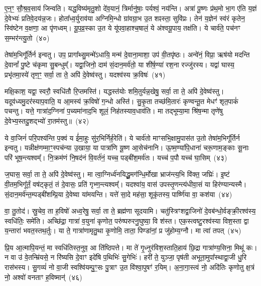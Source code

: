 ए॒न॒ꣳ॒ सौ॒श्र॒व॒साय॑ जिन्वति। यद्ध॒विष्य॑मृतु॒शो दे॑व॒यानं॒ त्रिर्मानु॑षाः॒ पर्यश्वं॒ नय॑न्ति। अत्रा॑ पू॒ष्णः प्र॑थ॒मो भा॒ग ए॑ति य॒ज्ञं दे॒वेभ्यः॑ प्रतिवे॒दय॑न्न॒जः। होता᳚ध्व॒र्युराव॑या अग्निमि॒न्धो ग्रा॑वग्रा॒भ उ॒त शꣴस्ता॒ सुवि॑प्रः। तेन॑ य॒ज्ञेन॑ स्व॑रं कृतेन॒ स्वि॑ष्टेन व॒क्षणा॒ आ पृ॑णध्वम्। यू॒प॒व्र॒स्का उ॒त ये यू॑पवा॒हाश्च॒षालं॒ ये अ॑श्वयू॒पाय॒ तक्ष॑ति। ये चार्व॑ते॒ पच॑नꣳ स॒म्भर॑न्त्यु॒तो~(४०)

तेषा॑म॒भिगू᳚र्तिर्न इन्वतु। उप॒ प्रागा᳚थ्सु॒मन्मे॑\-ऽधायि॒ मन्म॑ दे॒वाना॒माशा॒ उप॑ वी॒तपृ॑ष्ठः। अन्वे॑नं॒ विप्रा॒ ऋष॑यो मदन्ति दे॒वानां᳚ पु॒ष्टे च॑कृमा सु॒बन्धुम्᳚। यद्वा॒जिनो॒ दाम॑ सं॒दान॒मर्व॑तो॒ या शी॑र्\mbox{}ष॒ण्या॑ रश॒ना रज्जु॑रस्य। यद्वा॑ घास्य॒ प्रभृ॑तमा॒स्ये॑ तृण॒ꣳ॒ सर्वा॒ ता ते॒ अपि॑ दे॒वेष्व॑स्तु। यदश्व॑स्य क्र॒विषः॑~(४१)

मक्षि॒काश॒ यद्वा॒ स्वरौ॒ स्वधि॑तौ रि॒प्तमस्ति॑। यद्धस्त॑योः शमि॒तुर्यन्न॒खेषु॒ सर्वा॒ ता ते॒ अपि॑ दे॒वेष्व॑स्तु। यदूव॑ध्यमु॒दर॑स्याप॒वाति॒ य आ॒मस्य॑ क्र॒विषो॑ ग॒न्धो अस्ति॑। सु॒कृ॒ता तच्छ॑मि॒तारः॑ कृण्वन्तू॒त मेधꣳ॑ शृत॒पाकं॑ पचन्तु। यत्ते॒ गात्रा॑द॒ग्निना॑ प॒च्यमा॑नाद॒भि शूलं॒ निह॑तस्याव॒धाव॑ति। मा तद्भूम्या॒मा श्रि॑ष॒न्मा तृणे॑षु दे॒वेभ्य॒स्तदु॒शद्भ्यो॑ रा॒तम॑स्तु॥~(४२)

{\anuvakamend[{इदु॒तो क्र॒विषः॑ श्रिषथ्स॒प्त च॑}]}%

ये वा॒जिनं॑ परि॒पश्य॑न्ति प॒क्वं य ई॑मा॒हुः सु॑र॒भिर्निर्\mbox{}ह॒रेति॑। ये चार्व॑तो माꣳसभि॒क्षामु॒पास॑त उ॒तो तेषा॑म॒भिगू᳚र्तिर्न इन्वतु। यन्नीक्ष॑णम्मा॒ꣳ॒स्पच॑न्या उ॒खाया॒ या पात्रा॑णि यू॒ष्ण आ॒सेच॑नानि। ऊ॒ष्म॒ण्या॑पि॒धाना॑ चरू॒णाम॒ङ्काः सू॒नाः परि॑ भूष॒न्त्यश्वम्᳚। नि॒क्रम॑णं नि॒षद॑नं वि॒वर्त॑नं॒ यच्च॒ पड्बी॑श॒मर्व॑तः। यच्च॑ प॒पौ यच्च॑ घा॒सिम्~(४३)

ज॒घास॒ सर्वा॒ ता ते॒ अपि॑ दे॒वेष्व॑स्तु। मा त्वा॒ग्निर्ध्व॑नयिद्धू॒मग॑न्धि॒र्मोखा भ्राज॑न्त्य॒भि वि॑क्त॒ जघ्रिः॑। इ॒ष्टं वी॒तम॒भिगू᳚र्तं॒ वष॑ट्कृतं॒ तं दे॒वासः॒ प्रति॑ गृभ्ण॒न्त्यश्वम्᳚। यदश्वा॑य॒ वास॑ उपस्तृ॒णन्त्य॑धीवा॒सं या हिर॑ण्यान्यस्मै। सं॒दान॒मर्व॑न्त॒म्पड्बी॑शम्प्रि॒या दे॒वेष्वा या॑मयन्ति। यत्ते॑ सा॒दे मह॑सा॒ शूकृ॑तस्य॒ पार्ष्णि॑या वा॒ कश॑या~(४४)

वा॒ तु॒तोद॑। स्रु॒चेव॒ ता ह॒विषो॑ अध्व॒रेषु॒ सर्वा॒ ता ते॒ ब्रह्म॑णा सूदयामि। चतु॑स्त्रिꣳशद्वा॒जिनो॑ दे॒वब॑न्धो॒र्वङ्क्री॒रश्व॑स्य॒ स्वधि॑तिः॒ समे॑ति। अच्छि॑द्रा॒ गात्रा॑ व॒युना॑ कृणोत॒ परु॑ष्परुरनु॒घुष्या॒ वि श॑स्त। एक॒स्त्वष्टु॒रश्व॑स्या विश॒स्ता द्वा य॒न्तारा॑ भवत॒स्तथ॒र्तुः। या ते॒ गात्रा॑णामृतु॒था कृ॒णोमि॒ ताता॒ पिण्डा॑नां॒ प्र जु॑होम्य॒ग्नौ। मा त्वा॑ तपत्~(४५)

प्रि॒य आ॒त्मापि॒यन्तं॒ मा स्वधि॑तिस्त॒नुव॒ आ ति॑ष्ठिपत्ते। मा ते॑ गृ॒ध्नुर॑विश॒स्ताति॒हाय॑ छि॒द्रा गात्रा॑ण्य॒सिना॒ मिथू॑ कः। न वा उ॑ वे॒तन्म्रि॑यसे॒ न रि॑ष्यसि दे॒वाꣳ इदे॑षि प॒थिभिः॑ सु॒गेभिः॑। हरी॑ ते॒ युञ्जा॒ पृष॑ती अभूता॒मुपा᳚स्थाद्वा॒जी धु॒रि रास॑भस्य। सु॒गव्यं॑ नो वा॒जी स्वश्वि॑यम्पु॒ꣳ॒सः पु॒त्राꣳ उ॒त वि॑श्वा॒पुषꣳ॑ र॒यिम्। अ॒ना॒गा॒स्त्वं नो॒ अदि॑तिः कृणोतु क्ष॒त्रं नो॒ अश्वो॑ वनताꣳ ह॒विष्मान्॑~(४६)

